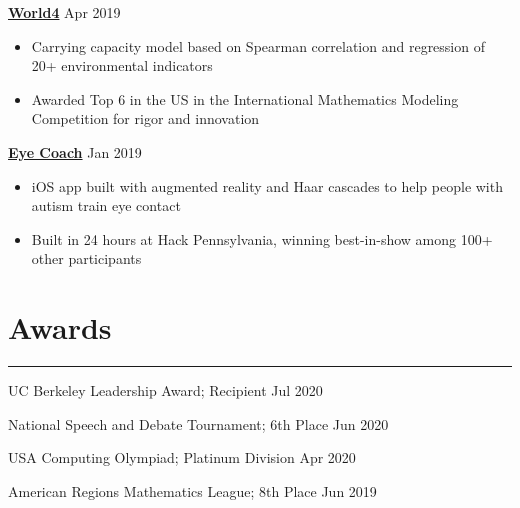 \documentclass[11pt]{article}
\newcommand{\resumesection}[1]{\vspace{-0.6cm}\section*{\color{highlight}#1}\vspace{-0.3cm}\hrule\vspace{0.2cm}}
\begin{document}
\textbf{\href{https://github.com/gautomdas/IMMC-World4/blob/master/US-9365.pdf}{World4}} \hfill Apr 2019\par
\begin{itemize}
	\item Carrying capacity model based on Spearman correlation and regression of 20+ environmental indicators
	\item Awarded Top 6 in the US in the International Mathematics Modeling Competition for rigor and innovation
\end{itemize}\vspace{0.1cm} \par

\textbf{\href{https://github.com/gautomdas/eye-coach}{Eye Coach}} \hfill Jan 2019 \par
\begin{itemize}
	\item iOS app built with augmented reality and Haar cascades to help people with autism train eye contact
	\item Built in 24 hours at Hack Pennsylvania, winning best-in-show among 100+ other participants
\end{itemize}\vspace{0.1cm} \par

\resumesection{Awards}

UC Berkeley Leadership Award; Recipient \hfill Jul 2020 \par
National Speech and Debate Tournament; 6th Place \hfill Jun 2020 \par
USA Computing Olympiad; Platinum Division \hfill Apr 2020 \par
American Regions Mathematics League; 8th Place \hfill Jun 2019 \par
\end{document}
